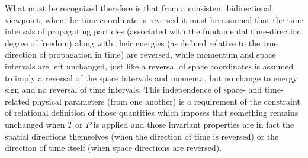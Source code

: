 \documentclass[notitlepage,12pt]{report}
\begin{document}
What must be recognized therefore is that from a consistent bidirectional viewpoint, when the time coordinate is reversed it must be assumed that the time intervals of propagating particles (associated with the fundamental time-direction degree of freedom) along with their energies (as defined relative to the true direction of propagation in time) are reversed, while momentum and space intervals are left unchanged, just like a reversal of space coordinates is assumed to imply a reversal of the space intervals and momenta, but no change to energy sign and no reversal of time intervals. This independence of space- and time-related physical parameters (from one another) is a requirement of the constraint of relational definition of those quantities which imposes that something remains unchanged when $T$ or $P$ is applied and those invariant properties are in fact the spatial directions themselves (when the direction of time is reversed) or the direction of time itself (when space directions are reversed).
\end{document}
